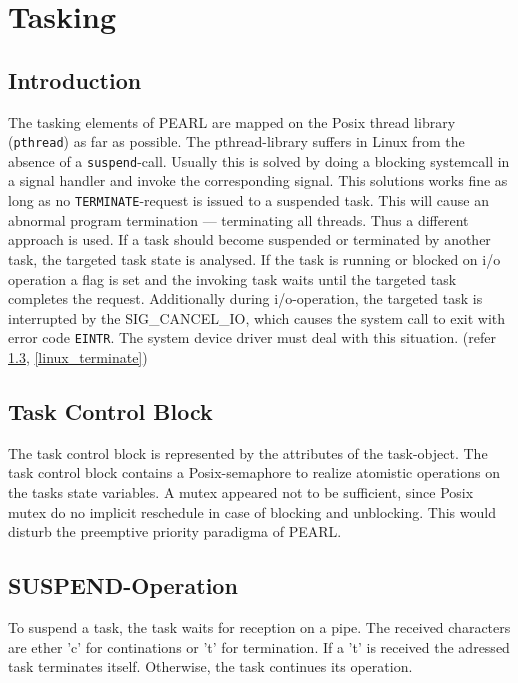 \section{Tasking}


\subsection{Introduction}
The tasking elements of PEARL are mapped on the Posix thread library 
(\verb|pthread|) as far as possible. 
The pthread-library suffers in Linux from the absence of a \verb|suspend|-call.
Usually this is solved by doing a blocking systemcall in a signal handler and
invoke the corresponding signal.
This solutions works fine as long as no \verb|TERMINATE|-request is
issued to a suspended task. This will cause an abnormal program
termination --- terminating all threads. 
Thus a different approach is used. If a task should become suspended or terminated
by another task, the targeted task state is analysed.
If the task is running or blocked on i/o operation a flag is set
and the invoking task waits until the targeted task completes the request.
Additionally during i/o-operation, the targeted task is interrupted by the 
SIG\_CANCEL\_IO, which causes the system call to exit
with error code \verb|EINTR|. The system device driver must deal with this
situation. (refer \ref{linux_suspend}, \ref{linux_terminate})

\subsection{Task Control Block}
The task control block is represented by the attributes of the 
task-object. 
The task control block contains a Posix-semaphore to realize atomistic
operations on the tasks state variables.
A mutex appeared not to be sufficient, since
Posix mutex do no implicit reschedule in case of blocking and unblocking.
This would disturb the preemptive priority  paradigma of PEARL.

\subsection{SUSPEND-Operation}
\label{linux_suspend}
To suspend a task, the task waits for reception on a pipe.
The received characters are ether 'c' for continations or 't' for termination.
If a 't' is received the adressed task terminates itself.
Otherwise, the task continues its operation.






